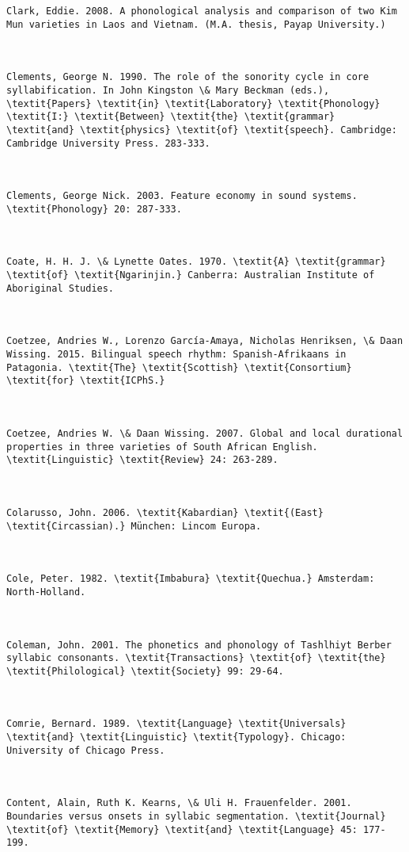 \begin{verbatim}
Clark, Eddie. 2008. A phonological analysis and comparison of two Kim Mun varieties in Laos and Vietnam. (M.A. thesis, Payap University.)



Clements, George N. 1990. The role of the sonority cycle in core syllabification. In John Kingston \& Mary Beckman (eds.), \textit{Papers} \textit{in} \textit{Laboratory} \textit{Phonology} \textit{I:} \textit{Between} \textit{the} \textit{grammar} \textit{and} \textit{physics} \textit{of} \textit{speech}. Cambridge: Cambridge University Press. 283-333.



Clements, George Nick. 2003. Feature economy in sound systems. \textit{Phonology} 20: 287-333.



Coate, H. H. J. \& Lynette Oates. 1970. \textit{A} \textit{grammar} \textit{of} \textit{Ngarinjin.} Canberra: Australian Institute of Aboriginal Studies.



Coetzee, Andries W., Lorenzo García-Amaya, Nicholas Henriksen, \& Daan Wissing. 2015. Bilingual speech rhythm: Spanish-Afrikaans in Patagonia. \textit{The} \textit{Scottish} \textit{Consortium} \textit{for} \textit{ICPhS.}



Coetzee, Andries W. \& Daan Wissing. 2007. Global and local durational properties in three varieties of South African English. \textit{Linguistic} \textit{Review} 24: 263-289.



Colarusso, John. 2006. \textit{Kabardian} \textit{(East} \textit{Circassian).} München: Lincom Europa.



Cole, Peter. 1982. \textit{Imbabura} \textit{Quechua.} Amsterdam: North-Holland.



Coleman, John. 2001. The phonetics and phonology of Tashlhiyt Berber syllabic consonants. \textit{Transactions} \textit{of} \textit{the} \textit{Philological} \textit{Society} 99: 29-64.



Comrie, Bernard. 1989. \textit{Language} \textit{Universals} \textit{and} \textit{Linguistic} \textit{Typology}. Chicago: University of Chicago Press.



Content, Alain, Ruth K. Kearns, \& Uli H. Frauenfelder. 2001. Boundaries versus onsets in syllabic segmentation. \textit{Journal} \textit{of} \textit{Memory} \textit{and} \textit{Language} 45: 177-199.




\end{verbatim}
